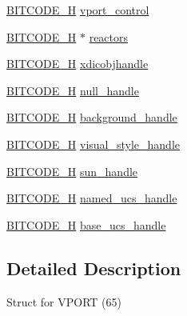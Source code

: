 \begin{DoxyCompactItemize}
\item 
\hyperlink{dwg_8h_a7c700e94e047a97ba8c24bdfe4029dc3}{\-B\-I\-T\-C\-O\-D\-E\-\_\-\-H} \hyperlink{struct__dwg__object__VPORT_adbe79a5c0f679db6bf79a839b8f0fedf}{vport\-\_\-control}
\item 
\hyperlink{dwg_8h_a7c700e94e047a97ba8c24bdfe4029dc3}{\-B\-I\-T\-C\-O\-D\-E\-\_\-\-H} $\ast$ \hyperlink{struct__dwg__object__VPORT_a8d04591ed82aeed82b52fdaa22ca3f59}{reactors}
\item 
\hyperlink{dwg_8h_a7c700e94e047a97ba8c24bdfe4029dc3}{\-B\-I\-T\-C\-O\-D\-E\-\_\-\-H} \hyperlink{struct__dwg__object__VPORT_a8e766327b4a909241571d6bad1f3f2aa}{xdicobjhandle}
\item 
\hyperlink{dwg_8h_a7c700e94e047a97ba8c24bdfe4029dc3}{\-B\-I\-T\-C\-O\-D\-E\-\_\-\-H} \hyperlink{struct__dwg__object__VPORT_ab309860216c2bdee164b4b386ab8feba}{null\-\_\-handle}
\item 
\hyperlink{dwg_8h_a7c700e94e047a97ba8c24bdfe4029dc3}{\-B\-I\-T\-C\-O\-D\-E\-\_\-\-H} \hyperlink{struct__dwg__object__VPORT_a4030d31670cd6a0b2e2cd08d95325132}{background\-\_\-handle}
\item 
\hyperlink{dwg_8h_a7c700e94e047a97ba8c24bdfe4029dc3}{\-B\-I\-T\-C\-O\-D\-E\-\_\-\-H} \hyperlink{struct__dwg__object__VPORT_a3cae76d3374cb60f3357a86f60d67182}{visual\-\_\-style\-\_\-handle}
\item 
\hyperlink{dwg_8h_a7c700e94e047a97ba8c24bdfe4029dc3}{\-B\-I\-T\-C\-O\-D\-E\-\_\-\-H} \hyperlink{struct__dwg__object__VPORT_a1a71ead503f44fde38fe4a83cb0a838b}{sun\-\_\-handle}
\item 
\hyperlink{dwg_8h_a7c700e94e047a97ba8c24bdfe4029dc3}{\-B\-I\-T\-C\-O\-D\-E\-\_\-\-H} \hyperlink{struct__dwg__object__VPORT_a822be28cb2252e16ee845c2e0df0ca8a}{named\-\_\-ucs\-\_\-handle}
\item 
\hyperlink{dwg_8h_a7c700e94e047a97ba8c24bdfe4029dc3}{\-B\-I\-T\-C\-O\-D\-E\-\_\-\-H} \hyperlink{struct__dwg__object__VPORT_a77cad42dde248e7c5e0280bc4c45547e}{base\-\_\-ucs\-\_\-handle}
\end{DoxyCompactItemize}


\subsection{\-Detailed \-Description}
\-Struct for \-V\-P\-O\-R\-T (65) 

